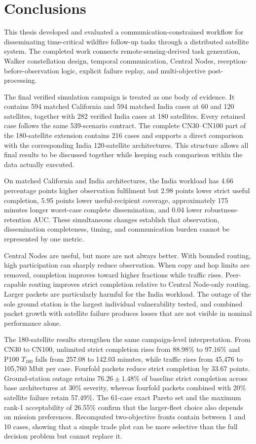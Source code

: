 \section{Conclusions}

This thesis developed and evaluated a communication-constrained workflow for disseminating time-critical wildfire follow-up tasks through a distributed satellite system. The completed work connects remote-sensing-derived task generation, Walker constellation design, temporal communication, Central Nodes, reception-before-observation logic, explicit failure replay, and multi-objective post-processing.

The final verified simulation campaign is treated as one body of evidence. It contains 594 matched California and 594 matched India cases at 60 and 120 satellites, together with 282 verified India cases at 180 satellites. Every retained case follows the same 539-scenario contract. The complete CN30--CN100 part of the 180-satellite extension contains 216 cases and supports a direct comparison with the corresponding India 120-satellite architectures. This structure allows all final results to be discussed together while keeping each comparison within the data actually executed.

On matched California and India architectures, the India workload has 4.66 percentage points higher observation fulfilment but 2.98 points lower strict useful completion, 5.95 points lower useful-recipient coverage, approximately 175 minutes longer worst-case complete dissemination, and 0.04 lower robustness-retention AUC. These simultaneous changes establish that observation, dissemination completeness, timing, and communication burden cannot be represented by one metric.

Central Nodes are useful, but more are not always better. With bounded routing, high participation can sharply reduce observation. When copy and hop limits are removed, completion improves toward higher fractions while traffic rises. Peer-capable routing improves strict completion relative to Central Node-only routing. Larger packets are particularly harmful for the India workload. The outage of the sole ground station is the largest individual vulnerability tested, and combined packet growth with satellite failure produces losses that are not visible in nominal performance alone.

The 180-satellite results strengthen the same campaign-level interpretation. From CN30 to CN100, unlimited strict completion rises from 88.98\% to 97.16\% and P100 $T_{100}$ falls from 257.08 to 142.03 minutes, while traffic rises from 45,476 to 105,760 Mbit per case. Fourfold packets reduce strict completion by 33.67 points. Ground-station outage retains $76.26\pm1.48$\% of baseline strict completion across base architectures at 30\% severity, whereas fourfold packets combined with 20\% satellite failure retain 57.49\%. The 61-case exact Pareto set and the maximum rank-1 acceptability of 26.55\% confirm that the larger-fleet choice also depends on mission preferences. Recomputed two-objective fronts contain between 1 and 10 cases, showing that a simple trade plot can be more selective than the full decision problem but cannot replace it.

